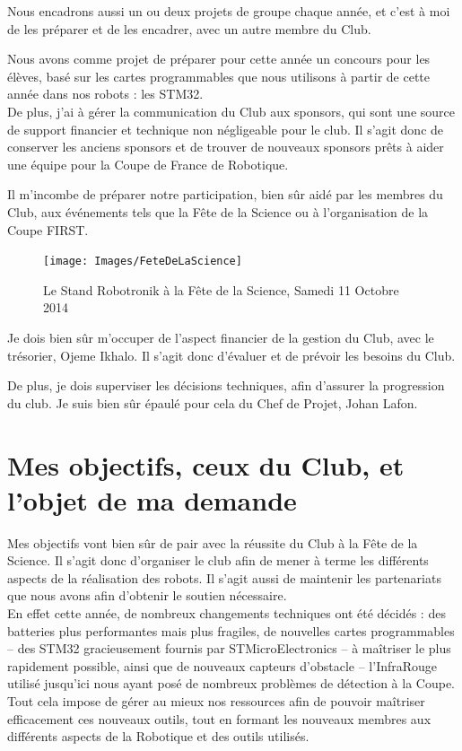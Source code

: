 \documentclass[a4paper,11pt]{article} \usepackage[T1]{fontenc} \usepackage[utf8]{inputenc} \usepackage[francais]{babel}
\begin{document}
    Nous encadrons aussi un ou deux projets de groupe chaque année, et c'est à moi de les préparer et de les encadrer, avec un autre membre du Club.

    Nous avons comme projet de préparer pour cette année un concours pour les élèves, basé sur les cartes programmables que nous utilisons à partir de cette année dans nos robots : les STM32.\\

    De plus, j'ai à gérer la communication du Club aux sponsors, qui sont une source de support financier et technique non négligeable pour le club. Il s'agit donc de conserver les anciens sponsors et de trouver de nouveaux sponsors prêts à aider une équipe pour la Coupe de France de Robotique.

    Il m'incombe de préparer notre participation, bien sûr aidé par les membres du Club, aux événements tels que la Fête de la Science ou à l'organisation de la Coupe FIRST.

    \begin{figure}[h] \begin{center} \texttt{[image: Images/FeteDeLaScience]}
        \caption{Le Stand Robotronik à la Fête de la Science, Samedi 11 Octobre 2014} \end{center} \end{figure}

    Je dois bien sûr m'occuper de l'aspect financier de la gestion du Club, avec le trésorier, Ojeme Ikhalo. Il s'agit donc d'évaluer et de prévoir les besoins du Club.

    De plus, je dois superviser les décisions techniques, afin d'assurer la progression du club. Je suis bien sûr épaulé pour cela du Chef de Projet, Johan Lafon.

\part{Mes objectifs, ceux du Club, et l'objet de ma demande}
Mes objectifs vont bien sûr de pair avec la réussite du Club à la Fête de la Science. Il s'agit donc d'organiser le club afin de mener à terme les différents aspects de la réalisation des robots. Il s'agit aussi de maintenir les partenariats que nous avons afin d'obtenir le soutien nécessaire.\\

En effet cette année, de nombreux changements techniques ont été décidés : des batteries plus performantes mais plus fragiles, de nouvelles cartes programmables -- des STM32 gracieusement fournis par STMicroElectronics -- à maîtriser le plus rapidement possible, ainsi que de nouveaux capteurs d'obstacle -- l'InfraRouge utilisé jusqu'ici nous ayant posé de nombreux problèmes de détection à la Coupe. Tout cela impose de gérer au mieux nos ressources afin de pouvoir maîtriser efficacement ces nouveaux outils, tout en formant les nouveaux membres aux différents aspects de la Robotique et des outils utilisés.\\
\end{document}
